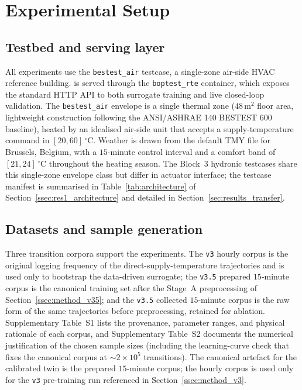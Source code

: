\section{Experimental Setup}
\label{sec:experimental_setup}

\subsection{Testbed and serving layer}
\label{ssec:exp_testbed}

All experiments use the \boptest{} \texttt{bestest\_air} testcase, a
single-zone air-side HVAC reference building. \boptest{} is served through
the \texttt{boptest\_rte} container, which exposes the standard \boptest{}
HTTP API to both surrogate training and live closed-loop validation.
The \texttt{bestest\_air} envelope is a single thermal zone
($48\,\mathrm{m}^{2}$ floor area, lightweight construction following the
ANSI/ASHRAE 140 BESTEST 600 baseline), heated by an idealised air-side
unit that accepts a supply-temperature command in
$[20,60]\,^{\circ}\mathrm{C}$. Weather is drawn from the \boptest{}
default TMY file for Brussels, Belgium, with a $15$-minute control
interval and a comfort band of $[21,24]\,^{\circ}\mathrm{C}$ throughout
the heating season. The Block~3 hydronic testcases share this
single-zone envelope class but differ in actuator interface; the
testcase manifest is summarised in Table~\ref{tab:architecture} of
Section~\ref{ssec:res1_architecture} and detailed in
Section~\ref{sec:results_transfer}.

\subsection{Datasets and sample generation}
\label{ssec:exp_datasets}

Three transition corpora support the experiments. The
\texttt{v3} hourly corpus is the original logging frequency of the
direct-supply-temperature trajectories and is used only to bootstrap
the data-driven surrogate; the \texttt{v3.5} prepared $15$-minute
corpus is the canonical training set after the Stage~A preprocessing
of Section~\ref{ssec:method_v35}; and the \texttt{v3.5} collected
$15$-minute corpus is the raw form of the same trajectories before
preprocessing, retained for ablation. Supplementary Table~S1 lists the
provenance, parameter ranges, and physical rationale of each corpus,
and Supplementary Table~S2 documents the numerical justification of
the chosen sample sizes (including the learning-curve check that
fixes the canonical corpus at $\sim\!2{\times}10^{5}$ transitions).
The canonical artefact for the calibrated twin is the prepared
$15$-minute corpus; the hourly corpus is used only for the
\texttt{v3} pre-training run referenced in
Section~\ref{ssec:method_v3}.

